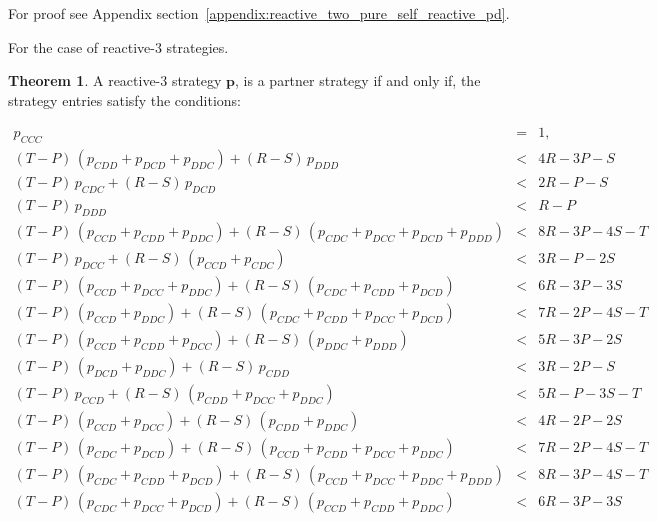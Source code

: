 \documentclass{article}
\theoremstyle{definition}
\newtheorem{theorem}{Theorem}[section]
\begin{document}
For proof see Appendix section~\ref{appendix:reactive_two_pure_self_reactive_pd}.


For the case of reactive-3 strategies.

\begin{theorem}\label{theorem:reactive_three_partner_strategies_PD}
A reactive-3 strategy $\mathbf{p}$, is a partner strategy if and only if,
the strategy entries satisfy the conditions:

\begin{equation*}
  \begin{array}{ccc}
    p_{CCC} & = & 1, \\ [0.2cm]
    (T - P)\, (p_{CDD} + p_{DCD} + p_{DDC}) + (R - S)\, p_{DDD}  & < & 4 R - 3 P  - S \\ [0.2cm]
    (T - P)\, p_{CDC}  + (R - S)\, p_{DCD}  & < & 2 R - P  - S \\ [0.2cm]
    (T - P)\, p_{DDD} & < & R - P\\ [0.2cm]
    (T - P)\,(p_{CCD} + p_{CDD} + p_{DDC}) + (R - S)\,(p_{CDC} + p_{DCC} + p_{DCD} + p_{DDD}) & < & 8 R - 3 P - 4 S - T \\ [0.2cm]
    (T - P)\, p_{DCC}  + (R - S)\,(p_{CCD} + p_{CDC}) & < & 3 R - P - 2 S \\ [0.2cm]
    (T - P)\,(p_{CCD} + p_{DCC} + p_{DDC}) + (R - S)\,(p_{CDC} + p_{CDD} + p_{DCD}) & < & 6 R - 3 P - 3 S \\ [0.2cm]
    (T - P)\,(p_{CCD} + p_{DDC}) + (R - S)\,(p_{CDC} + p_{CDD} + p_{DCC} + p_{DCD}) & < & 7 R - 2 P - 4 S - T \\ [0.2cm]
    (T - P)\,(p_{CCD} + p_{CDD} + p_{DCC}) + (R - S)\,(p_{DDC} + p_{DDD}) & < & 5 R - 3 P - 2 S \\ [0.2cm]
    (T - P)\,(p_{DCD} + p_{DDC}) + (R - S)\, p_{CDD}  & < & 3 R - 2 P - S \\ [0.2cm] 
    (T - P)\, p_{CCD} + (R - S)\,(p_{CDD} + p_{DCC} + p_{DDC}) & < & 5 R - P - 3 S - T \\ [0.2cm]
    (T - P)\,(p_{CCD} + p_{DCC}) + (R - S)\,(p_{CDD} + p_{DDC}) & < & 4 R - 2 P - 2 S \\ [0.2cm]
    (T - P)\,(p_{CDC} + p_{DCD}) + (R - S)\,(p_{CCD} + p_{CDD} + p_{DCC} + p_{DDC}) & < & 7 R - 2 P - 4 S - T \\ [0.2cm]
    (T - P)\,(p_{CDC} + p_{CDD} + p_{DCD}) + (R - S)\,(p_{CCD} + p_{DCC} + p_{DDC} + p_{DDD}) & < & 8 R - 3 P - 4 S - T \\ [0.2cm]
    (T - P)\,(p_{CDC} + p_{DCC} + p_{DCD}) + (R - S)\,(p_{CCD} + p_{CDD} + p_{DDC}) & < & 6 R - 3 P - 3 S \\ [0.2cm]

\end{array}
\end{equation*}
\end{theorem}
\end{document}
